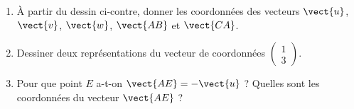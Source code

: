 
\begin{exercice}\label{exosmath-0103}

    \begin{multicols}{2}
        \begin{enumerate}
            \item
                À partir du dessin ci-contre, donner les coordonnées des vecteurs \( \vect{ u }\), \( \vect{ v }\), \( \vect{ w }\), \( \vect{ AB }\) et \( \vect{ CA }\).
            \item
                Dessiner deux représentations du vecteur de coordonnées \( \begin{pmatrix}
                    1    \\ 
                    3    
                \end{pmatrix}\).

            \item
                Pour que point \( E\) a-t-on \( \vect{ AE }=-\vect{ u }\) ? Quelles sont les coordonnées du vecteur \( \vect{ AE }\) ?
             
        \end{enumerate}
        \columnbreak

        \begin{center}

        \end{center}
    \end{multicols}


\end{exercice}
